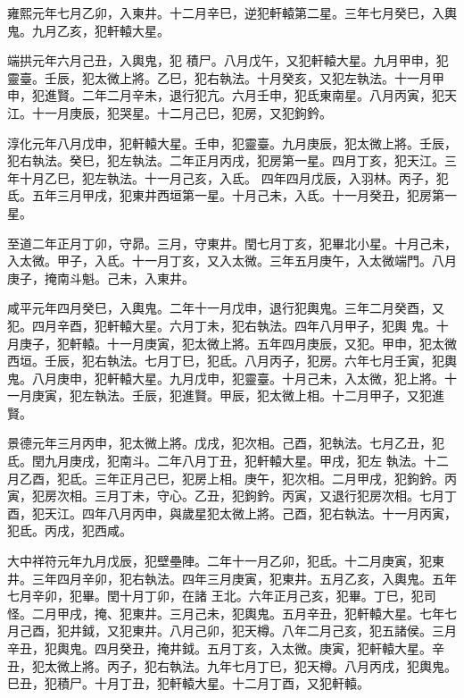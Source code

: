 \begin{pinyinscope}
 雍熙元年七月乙卯，入東井。十二月辛巳，逆犯軒轅第二星。三年七月癸巳，入輿鬼。九月乙亥，犯軒轅大星。



 端拱元年六月己丑，入輿鬼，犯
 積尸。八月戊午，又犯軒轅大星。九月甲申，犯靈臺。壬辰，犯太微上將。乙巳，犯右執法。十月癸亥，又犯左執法。十一月甲申，犯進賢。二年二月辛未，退行犯亢。六月壬申，犯氐東南星。八月丙寅，犯天江。十一月庚辰，犯哭星。十二月己巳，犯房，又犯鉤鈐。



 淳化元年八月戊申，犯軒轅大星。壬申，犯靈臺。九月庚辰，犯太微上將。壬辰，犯右執法。癸巳，犯左執法。二年正月丙戌，犯房第一星。四月丁亥，犯天江。三年十月乙巳，犯左執法。十一月己亥，入氐。
 四年四月戊辰，入羽林。丙子，犯氐。五年三月甲戌，犯東井西垣第一星。十月己未，入氐。十一月癸丑，犯房第一星。



 至道二年正月丁卯，守昴。三月，守東井。閏七月丁亥，犯畢北小星。十月己未，入太微。甲子，入氐。十一月丁亥，又入太微。三年五月庚午，入太微端門。八月庚子，掩南斗魁。己未，入東井。



 咸平元年四月癸巳，入輿鬼。二年十一月戊申，退行犯輿鬼。三年二月癸酉，又犯。四月辛酉，犯軒轅大星。六月丁未，犯右執法。四年八月甲子，犯輿
 鬼。十月庚子，犯軒轅。十一月庚寅，犯太微上將。五年四月庚辰，又犯。甲申，犯太微西垣。壬辰，犯右執法。七月丁巳，犯氐。八月丙子，犯房。六年七月壬寅，犯輿鬼。八月庚申，犯軒轅大星。九月戊申，犯靈臺。十月己未，入太微，犯上將。十一月庚寅，犯左執法。壬辰，犯進賢。甲辰，犯太微上相。十二月甲子，又犯進賢。



 景德元年三月丙申，犯太微上將。戊戌，犯次相。己酉，犯執法。七月乙丑，犯氐。閏九月庚戌，犯南斗。二年八月丁丑，犯軒轅大星。甲戌，犯左
 執法。十二月乙酉，犯氐。三年正月己巳，犯房上相。庚午，犯次相。二月甲戌，犯鉤鈐。丙寅，犯房次相。三月丁未，守心。乙丑，犯鉤鈐。丙寅，又退行犯房次相。七月丁酉，犯天江。四年八月丙申，與歲星犯太微上將。己酉，犯右執法。十一月丙寅，犯氐。丙戌，犯西咸。



 大中祥符元年九月戊辰，犯壁壘陣。二年十一月乙卯，犯氐。十二月庚寅，犯東井。三年四月辛卯，犯右執法。四年三月庚寅，犯東井。五月乙亥，入輿鬼。五年七月辛卯，犯畢。閏十月丁卯，在諸
 王北。六年正月己亥，犯畢。丁巳，犯司怪。二月甲戌，掩、犯東井。三月己未，犯輿鬼。五月辛丑，犯軒轅大星。七年七月己酉，犯井鉞，又犯東井。八月己卯，犯天樽。八年二月己亥，犯五諸侯。三月辛丑，犯輿鬼。四月癸丑，掩井鉞。五月丁亥，入太微。庚寅，犯軒轅大星。辛丑，犯太微上將。丙子，犯右執法。九年七月丁巳，犯天樽。八月丙戌，犯輿鬼。巳丑，犯積尸。十月丁丑，犯軒轅大星。十二月丁酉，又犯軒轅。




\end{pinyinscope}
